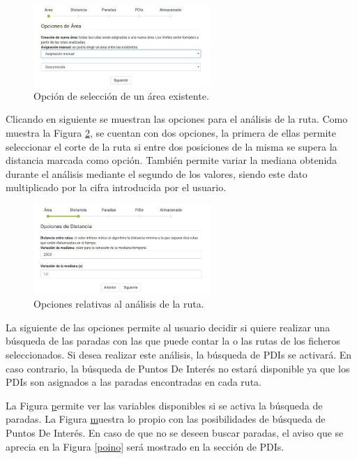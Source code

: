 \begin{figure}[h]
  \centering
    \includegraphics[width=0.6\textwidth]{../img/manualusuario/areaoption1.jpg}
  \caption{Opción de selección de un área existente.}
  \label{areaoption1}
\end{figure}

Clicando en siguiente se muestran las opciones para el análisis de la ruta. Como muestra la Figura \ref{rutaoption}, se cuentan con dos opciones, la primera de ellas permite seleccionar el corte de la ruta si entre dos posiciones de la misma se supera la distancia marcada como opción. También permite variar la mediana obtenida durante el análisis mediante el segundo de los valores, siendo este dato multiplicado por la cifra introducida por el usuario.

\begin{figure}[h]
  \centering
    \includegraphics[width=0.6\textwidth]{../img/manualusuario/rutaoption.jpg}
  \caption{Opciones relativas al análisis de la ruta.}
  \label{rutaoption}
\end{figure}

La siguiente de las opciones permite al usuario decidir si quiere realizar una búsqueda de las paradas con las que puede contar la o las rutas de los ficheros seleccionados. Si desea realizar este análisis, la búsqueda de PDIs se activará. En caso contrario, la búsqueda de Puntos De Interés no estará disponible ya que los PDIs son asignados a las paradas encontradas en cada ruta.

La Figura \href{paradasi} permite ver las variables disponibles si se activa la búsqueda de paradas. La Figura \href{poisi} muestra lo propio con las posibilidades de búsqueda de Puntos De Interés. En caso de que no se deseen buscar paradas, el aviso que se aprecia en la Figura \ref{poino} será mostrado en la sección de PDIs.

